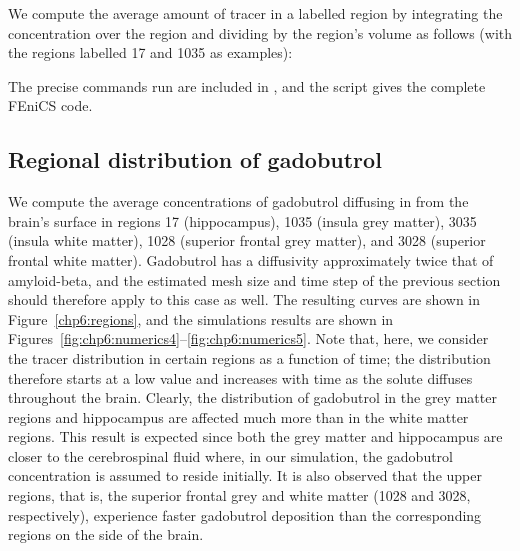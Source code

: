 \noindent We compute the average amount of tracer in a labelled region by
integrating the concentration over the region and dividing by the
region's volume as follows (with the regions labelled 17 and 1035 as
examples):

\noindent The precise commands run are included in
, and the script
 gives the complete
FEniCS code.

\subsection{Regional distribution of gadobutrol}
We compute the average concentrations of gadobutrol diffusing in from
the brain's surface in regions 17 (hippocampus), 1035 (insula grey
matter), 3035 (insula white matter), 1028 (superior frontal grey
matter), and 3028 (superior frontal white matter).  Gadobutrol has a
diffusivity approximately twice that of amyloid-beta, and the
estimated mesh size and time step of the previous section should therefore apply
to this case as well.  The resulting curves are shown in
Figure~\ref{chp6:regions}, and the simulations results are shown in
Figures~\ref{fig:chp6:numerics4}--\ref{fig:chp6:numerics5}. Note that, here, 
we consider the tracer distribution in certain regions as a
function of time; the distribution therefore starts at a low value and increases 
with time as the solute diffuses throughout the brain. Clearly, the
distribution of gadobutrol in the grey matter regions and hippocampus
are affected much more than in the white matter regions. This result is
expected since both the grey matter and hippocampus are
closer to the cerebrospinal fluid where, in our simulation, the gadobutrol
concentration is assumed to reside initially.  It is also observed
that the upper regions, that is, the superior frontal grey and white matter
(1028 and 3028, respectively), experience faster gadobutrol deposition
than the corresponding regions on the side of the brain.
